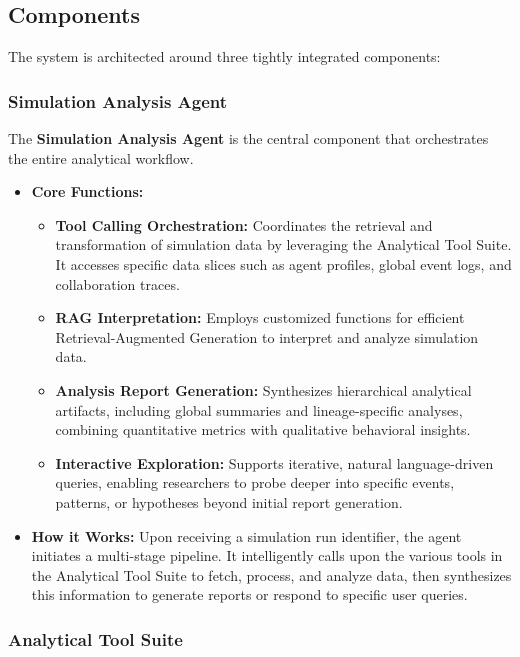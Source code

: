 \subsection{Components}

The system is architected around three tightly integrated components:

\subsubsection{Simulation Analysis Agent}

The \textbf{Simulation Analysis Agent} is the central component that orchestrates the entire analytical workflow.

\begin{itemize}
    \item \textbf{Core Functions:}
    \begin{itemize}
        \item \textbf{Tool Calling Orchestration:} Coordinates the retrieval and transformation of simulation data by leveraging the Analytical Tool Suite. It accesses specific data slices such as agent profiles, global event logs, and collaboration traces.
        \item \textbf{RAG Interpretation:} Employs customized functions for efficient Retrieval-Augmented Generation to interpret and analyze simulation data.
        \item \textbf{Analysis Report Generation:} Synthesizes hierarchical analytical artifacts, including global summaries and lineage-specific analyses, combining quantitative metrics with qualitative behavioral insights.
        \item \textbf{Interactive Exploration:} Supports iterative, natural language-driven queries, enabling researchers to probe deeper into specific events, patterns, or hypotheses beyond initial report generation.
    \end{itemize}
    \item \textbf{How it Works:}
    Upon receiving a simulation run identifier, the agent initiates a multi-stage pipeline. It intelligently calls upon the various tools in the Analytical Tool Suite to fetch, process, and analyze data, then synthesizes this information to generate reports or respond to specific user queries.
\end{itemize}

\subsubsection{Analytical Tool Suite}

